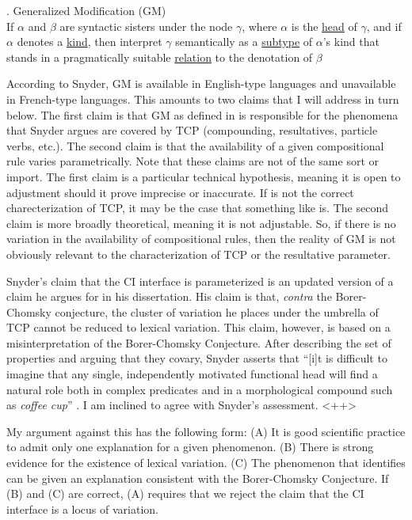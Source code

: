 \documentclass[MilwayThesis]{subfiles}
\begin{document}
\ex. Generalized Modification (GM)\\
If $\alpha$ and $\beta$ are syntactic sisters under the node $\gamma$, where $\alpha$ is the \uline{head} of $\gamma$, and if $\alpha$ denotes a \uline{kind}, then interpret $\gamma$ semantically as a \uline{subtype} of $\alpha$'s kind that stands in a pragmatically suitable \uline{relation} to the denotation of $\beta$

According to Snyder, GM is available in English-type languages and unavailable in French-type languages.
This amounts to two claims that I will address in turn below.
The first claim is that GM as defined in \Last is responsible for the phenomena that Snyder argues are covered by TCP (compounding, resultatives, particle verbs, etc.).
The second claim is that the availability of a given compositional rule varies parametrically.
Note that these claims are not of the same sort or import.
The first claim is a particular technical hypothesis, meaning it is open to adjustment should it prove imprecise or inaccurate.
If \Last is not the correct charecterization of TCP, it may be the case that something like \Last is.
The second claim is more broadly theoretical, meaning it is not adjustable.
So, if there is no variation in the availability of compositional rules, then the reality of GM is not obviously relevant to the characterization of TCP or the resultative parameter.

Snyder's claim that the CI interface is parameterized is an updated version of a claim he argues for in his \citeyear{snyder1995language} dissertation.
His claim is that, \textit{contra} the Borer-Chomsky conjecture, the cluster of variation he places under the umbrella of TCP cannot be reduced to lexical variation.
This claim, however, is based on a misinterpretation of the Borer-Chomsky Conjecture.
After describing the set of properties and arguing that they covary, Snyder asserts that ``[i]t is difficult to imagine that any single, independently motivated functional head will find a natural role both in complex predicates and in a morphological compound such as \textit{coffee cup}'' \parencite[62]{snyder1995language}.
I am inclined to agree with Snyder's assessment.
<++>

My argument against this has the following form:
(A) It is good scientific practice to admit only one explanation for a given phenomenon.
(B) There is strong evidence for the existence of lexical variation.
(C) The phenomenon that \textcite{snyder1995language} identifies can be given an explanation consistent with the Borer-Chomsky Conjecture.
If (B) and (C) are correct, (A) requires that we reject the claim that the CI interface is a locus of variation.
\end{document}
